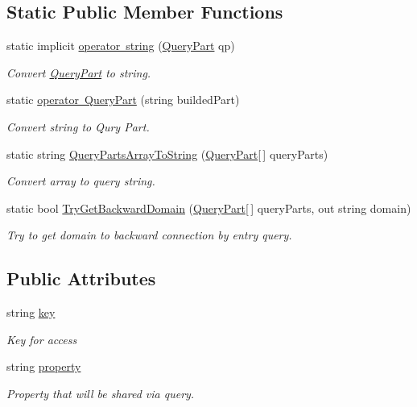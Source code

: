 \subsection*{Static Public Member Functions}
\begin{DoxyCompactItemize}
\item 
static implicit \mbox{\hyperlink{struct_uniform_queries_1_1_query_part_a274b321f91ecbda08f01c23536a568b6}{operator string}} (\mbox{\hyperlink{struct_uniform_queries_1_1_query_part}{Query\+Part}} qp)
\begin{DoxyCompactList}\small\item\em Convert \mbox{\hyperlink{struct_uniform_queries_1_1_query_part}{Query\+Part}} to string. \end{DoxyCompactList}\item 
static \mbox{\hyperlink{struct_uniform_queries_1_1_query_part_ab0c6ca9b91045a64286bf730ad97dc43}{operator Query\+Part}} (string builded\+Part)
\begin{DoxyCompactList}\small\item\em Convert string to Qury Part. \end{DoxyCompactList}\item 
static string \mbox{\hyperlink{struct_uniform_queries_1_1_query_part_a053c8ba08ddd1a20d5b50128a524da09}{Query\+Parts\+Array\+To\+String}} (\mbox{\hyperlink{struct_uniform_queries_1_1_query_part}{Query\+Part}}\mbox{[}$\,$\mbox{]} query\+Parts)
\begin{DoxyCompactList}\small\item\em Convert array to query string. \end{DoxyCompactList}\item 
static bool \mbox{\hyperlink{struct_uniform_queries_1_1_query_part_accd3b435809c426dd92456ffee0a996d}{Try\+Get\+Backward\+Domain}} (\mbox{\hyperlink{struct_uniform_queries_1_1_query_part}{Query\+Part}}\mbox{[}$\,$\mbox{]} query\+Parts, out string domain)
\begin{DoxyCompactList}\small\item\em Try to get domain to backward connection by entry query. \end{DoxyCompactList}\end{DoxyCompactItemize}
\subsection*{Public Attributes}
\begin{DoxyCompactItemize}
\item 
string \mbox{\hyperlink{struct_uniform_queries_1_1_query_part_a24186fc4f67752331342e84554f806ff}{key}}
\begin{DoxyCompactList}\small\item\em Key for access \end{DoxyCompactList}\item 
string \mbox{\hyperlink{struct_uniform_queries_1_1_query_part_aa8167f347217469ed47b298f2bc16381}{property}}
\begin{DoxyCompactList}\small\item\em Property that will be shared via query. \end{DoxyCompactList}\end{DoxyCompactItemize}
